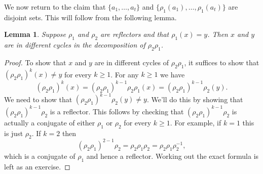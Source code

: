 \documentclass[11pt]{article}
\newtheorem{lemma}{Lemma}
\begin{document}
We now return to the claim that $\{a_1,\ldots,a_t\}$ and 
$\{\rho_1(a_1),\ldots,\rho_1(a_t)\}$
are disjoint sets. 
This will follow from the following lemma. 
\begin{lemma}
    Suppose $\rho_1$ and $\rho_2$ are reflectors and that $\rho_1(x)=y$.
    Then $x$ and $y$ are in different cycles in the decomposition of
    $\rho_2\rho_1$.
\end{lemma}
\begin{proof}
    To show that $x$ and $y$ are in different cycles of $\rho_2\rho_1$, it
    suffices to show that $(\rho_2\rho_1)^k(x) \neq y$ for every $k\geq 1$.
    For any $k\geq 1$ we have
    \[
        (\rho_2\rho_1)^k(x)
        = (\rho_2\rho_1)^{k-1}\rho_2\rho_1(x)
        = (\rho_2\rho_1)^{k-1}\rho_2(y).
    \]
    We need to show that $(\rho_2\rho_1)^{k-1}\rho_2(y)\neq y$. We'll do this
    by showing that $(\rho_2\rho_1)^{k-1}\rho_2$ is a reflector.
    This follows by checking that $(\rho_2\rho_1)^{k-1}\rho_2$ is actually
    a conjugate of either $\rho_1$ or $\rho_2$ for every $k\geq 1$. For
    example, if $k=1$ this is just $\rho_2$. If $k=2$ then
    \[
        (\rho_2\rho_1)^{2-1}\rho_2 = \rho_2\rho_1\rho_2 = 
         \rho_2\rho_1\rho_2^{-1}, 
    \]
    which is a conjugate of $\rho_1$ and hence a reflector. Working out
    the exact formula is left as an exercise.
\end{proof}
\end{document}
